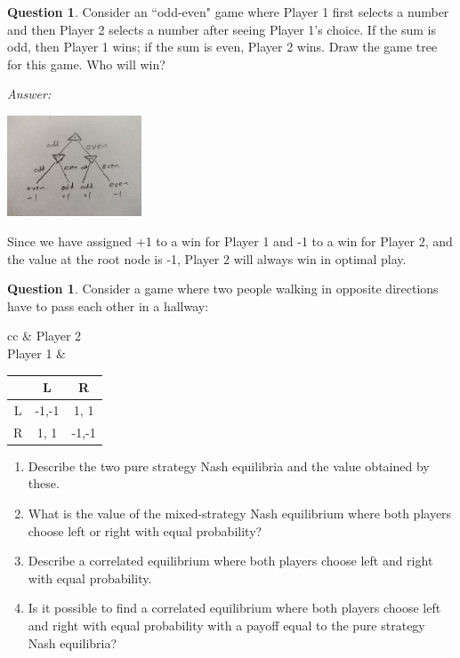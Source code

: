 \documentclass{article}
\theoremstyle{definition}
\newtheorem{question}[thm]{Question}
\newenvironment{answer}{\noindent\textit{Answer:}}{}
\begin{document}
\begin{question}
    Consider an ``odd-even" game where Player 1 first selects a number and then Player 2 selects a number after seeing Player 1's choice. If the sum is odd, then Player 1 wins; if the sum is even, Player 2 wins. Draw the game tree for this game. Who will win?
\end{question}

\begin{answer}

    \includegraphics[width=0.3\textwidth]{odd-even-tree.jpg}
    
    Since we have assigned +1 to a win for Player 1 and -1 to a win for Player 2, and the value at the root node is -1, Player 2 will always win in optimal play.
\end{answer}

\begin{question}
    Consider a game where two people walking in opposite directions have to pass each other in a hallway:

\begin{tabular}{cc}
& Player 2 \\
    Player 1 &
    \begin{tabular}{c|c|c|}
          & L & R \\\hline
        L & -1,-1 & 1, 1 \\ \hline
        R & 1, 1 & -1,-1 \\ \hline
    \end{tabular}
\end{tabular}

\begin{enumerate}
    \item Describe the two pure strategy Nash equilibria and the value obtained by these.
    \item What is the value of the mixed-strategy Nash equilibrium where both players choose left or right with equal probability?
    \item Describe a correlated equilibrium where both players choose left and right with equal probability.
    \item Is it possible to find a correlated equilibrium where both players choose left and right with equal probability with a payoff equal to the pure strategy Nash equilibria?
\end{enumerate}

\end{question}
\end{document}
